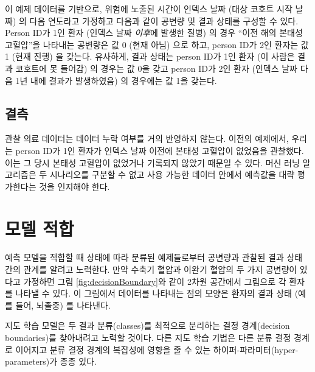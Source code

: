 \documentclass[10.5pt]{book}
\theoremstyle{definition}
\theoremstyle{definition}
\theoremstyle{definition}
\theoremstyle{remark}
\begin{document}
이 예제 데이터를 기반으로, 위험에 노출된 시간이 인덱스 날짜 (대상 코호트
시작 날짜) 의 다음 연도라고 가정하고 다음과 같이 공변량 및 결과 상태를
구성할 수 있다. Person ID가 1인 환자 (인덱스 날짜 \emph{이후}에 발생한
질병) 의 경우 ``이전 해의 본태성 고혈압''을 나타내는 공변량은 값 0 (현재
아님) 으로 하고, person ID가 2인 환자는 값 1 (현재 진행) 을 갖는다.
유사하게, 결과 상태는 person ID가 1인 환자 (이 사람은 결과 코호트에 못
들어감) 의 경우는 값 0을 갖고 person ID가 2인 환자 (인덱스 날짜 다음 1년
내에 결과가 발생하였음) 의 경우에는 값 1을 갖는다.

\subsection{결측}

관찰 의료 데이터는 데이터 누락 여부를 거의 반영하지 않는다. 이전의
예제에서, 우리는 person ID가 1인 환자가 인덱스 날짜 이전에 본태성
고혈압이 없었음을 관찰했다. 이는 그 당시 본태성 고혈압이 없었거나
기록되지 않았기 때문일 수 있다. 머신 러닝 알고리즘은 두 시나리오를
구분할 수 없고 사용 가능한 데이터 안에서 예측값을 대략 평가한다는 것을
인지해야 한다. 

\section{모델 적합}\label{modelFitting}

예측 모델을 적합할 때 상태에 따라 분류된 예제들로부터 공변량과 관찰된
결과 상태 간의 관계를 알려고 노력한다. 만약 수축기 혈압과 이완기 혈압의
두 가지 공변량이 있다고 가정하면 그림 \ref{fig:decisionBoundary}와 같이
2차원 공간에서 그림으로 각 환자를 나타낼 수 있다. 이 그림에서 데이터를
나타내는 점의 모양은 환자의 결과 상태 (예를 들어, 뇌졸중) 를 나타낸다.

지도 학습 모델은 두 결과 분류(classes)를 최적으로 분리하는 결정
경계(decision boundaries)를 찾아내려고 노력할 것이다. 다른 지도 학습
기법은 다른 분류 결정 경계로 이어지고 분류 결정 경계의 복잡성에 영향을
줄 수 있는 하이퍼-파라미터(hyper-parameters)가 종종 있다.
\end{document}
